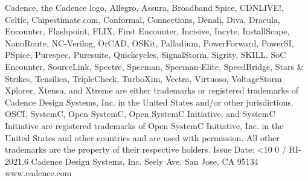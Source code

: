 \documentclass[twoside]{book}
\newcommand{\+}{\discretionary{\mbox{\scriptsize$\hookleftarrow$}}{}{}}
\newcommand{\clearemptydoublepage}{%
  \newpage{\pagestyle{empty}\cleardoublepage}%
}
\newcommand{\twodigits}[1]{%
  \ifnum#1<10 0#1\else #1\fi
}
\begin{document}
\begin{titlepage}
{\vspace*{0.2cm}
\newline Cadence, the Cadence logo, Allegro, Assura, Broadband Spice, CDNLIVE!, Celtic, Chipestimate.com, Conformal, Connections, Denali, Diva, Dracula, Encounter, Flashpoint, FLIX, First Encounter, Incisive, Incyte, InstallScape, NanoRoute, NC-Verilog, OrCAD, OSKit, Palladium, PowerForward, PowerSI, PSpice, Purespec, Puresuite, Quickcycles, SignalStorm, Sigrity, SKILL, SoC Encounter, SourceLink, Spectre, Specman, Specman-Elite, SpeedBridge, Stars \& Strikes, Tensilica, TripleCheck, TurboXim, Vectra, Virtuoso, VoltageStorm Xplorer, Xtensa, and Xtreme are either trademarks or registered trademarks of Cadence Design Systems, Inc. in the United States and/or other jurisdictions. 
OSCI, SystemC, Open SystemC, Open SystemC Initiative, and SystemC Initiative are registered trademarks of Open SystemC Initiative, Inc. in the United States and other countries and are used with permission. All other trademarks are the property of their respective holders.
\vspace*{2.5cm}
\newline Issue Date: \twodigits{\the\month}/{\the\year}
\newline RI-2021.6
\vspace*{0.4cm}
\newline
\vspace*{0.5cm}
\newline Cadence Design Systems, Inc.
 Seely Ave.
\newline San Jose, CA 95134
\newline www.cadence.com
}
\end{titlepage}
\clearemptydoublepage

{}
\tableofcontents
\clearemptydoublepage
{}
\listoftables
\clearemptydoublepage
{}
\listoffigures
\clearemptydoublepage

\hypersetup{pageanchor=true}

\end{document}

